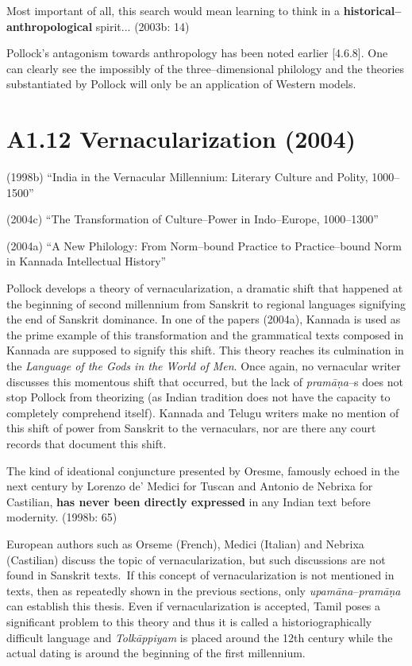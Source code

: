 {{{\begin{myquote}
Most important of all, this search would mean learning to think in a \textbf{historical–anthropological} spirit... (2003b: 14)
\end{myquote}

Pollock’s antagonism towards anthropology has been noted earlier [4.6.8]. One can clearly see the impossibly of the three–dimensional philology and the theories substantiated by Pollock will only be an application of Western models.

\vspace {-.4cm}

\section*{A1.12 Vernacularization (2004)}

(1998b) “India in the Vernacular Millennium: Literary Culture and Polity, 1000–1500”

(2004c) “The Transformation of Culture–Power in Indo–Europe, 1000–1300”

(2004a) “A New Philology: From Norm–bound Practice to Practice–bound Norm in Kannada Intellectual History”

Pollock develops a theory of vernacularization, a dramatic shift that happened at the beginning of second millennium from Sanskrit to regional languages signifying the end of Sanskrit dominance. In one of the papers (2004a), Kannada is used as the prime example of this transformation and the grammatical texts composed in Kannada are supposed to signify this shift. This theory reaches its culmination in the \textit{Language of the Gods in the World of Men}. Once again, no vernacular writer discusses this momentous shift that occurred, but the lack of \textit{pramāṇa}–s does not stop Pollock from theorizing (as Indian tradition does not have the capacity to completely comprehend itself). Kannada and Telugu writers make no mention of this shift of power from Sanskrit to the vernaculars, nor are there any court records that document this shift.

\begin{myquote}
The kind of ideational conjuncture presented by Oresme, famously echoed in the next century by Lorenzo de’ Medici for Tuscan and Antonio de Nebrixa for Castilian, \textbf{has never been directly expressed} in any Indian text before modernity. (1998b: 65)
\end{myquote}

European authors such as Orseme (French), Medici (Italian) and Nebrixa (Castilian) discuss the topic of vernacularization, but such discussions are not found in Sanskrit texts.~If this concept of vernacularization is not mentioned in texts, then as repeatedly shown in the previous sections, only \textit{upamāna}–\textit{pramāṇa} can establish this thesis. Even if vernacularization is accepted, Tamil poses a significant problem to this theory and thus it is called a historiographically difficult language and \textit{Tolkāppiyam} is placed around the 12th century while the actual dating is around the beginning of the first millennium.

}}}
